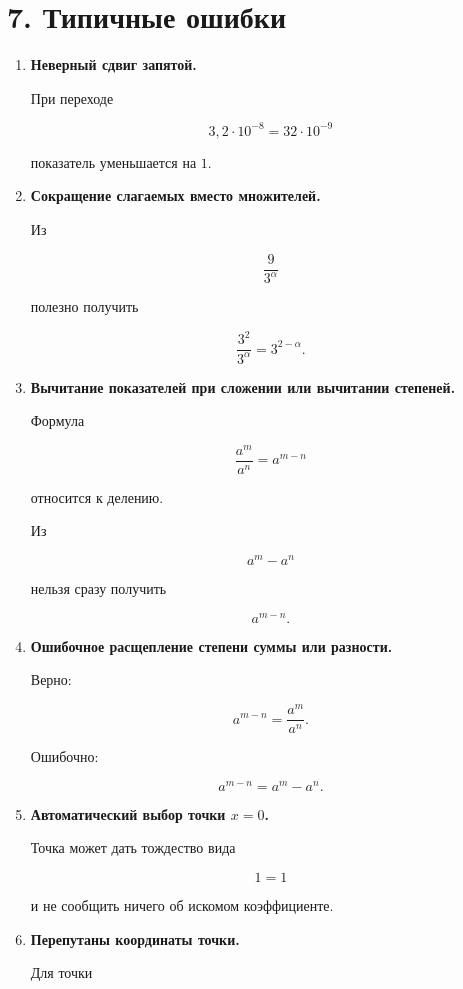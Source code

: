 \documentclass[a4paper,12pt]{article}
\newcommand{\important}[1]{\textbf{\color{darkaccent}#1}}
\begin{document}
\clearpage

\section{7. Типичные ошибки}

\begin{enumerate}

\item
\important{Неверный сдвиг запятой.}

При переходе

\[
3{,}2\cdot10^{-8}
=
32\cdot10^{-9}
\]

показатель уменьшается на \(1\).

\item
\important{Сокращение слагаемых вместо множителей.}

Из

\[
\frac{9}{3^\alpha}
\]

полезно получить

\[
\frac{3^2}{3^\alpha}
=
3^{2-\alpha}.
\]

\item
\important{Вычитание показателей при сложении или вычитании степеней.}

Формула

\[
\frac{a^m}{a^n}=a^{m-n}
\]

относится к делению.

Из

\[
a^m-a^n
\]

нельзя сразу получить

\[
a^{m-n}.
\]

\item
\important{Ошибочное расщепление степени суммы или разности.}

Верно:

\[
a^{m-n}
=
\frac{a^m}{a^n}.
\]

Ошибочно:

\[
a^{m-n}=a^m-a^n.
\]

\item
\important{Автоматический выбор точки \(x=0\).}

Точка может дать тождество вида

\[
1=1
\]

и не сообщить ничего об искомом коэффициенте.

\item
\important{Перепутаны координаты точки.}

Для точки


\end{enumerate}
\end{document}
